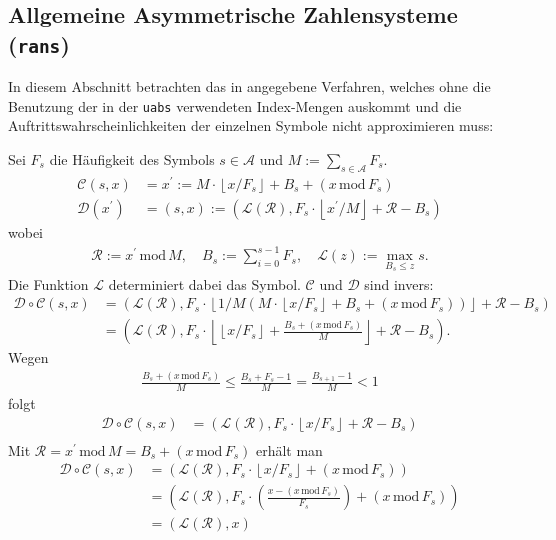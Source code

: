 \documentclass[a4paper,12pt]{article}
\newcommand{\R}{\mathcal R}
\newcommand{\A}{\mathcal A}
\newcommand{\C}{\mathcal C}
\newcommand{\D}{\mathcal D}
\newcommand{\xL}{\mathcal L}
\begin{document}
\subsection{Allgemeine Asymmetrische Zahlensysteme ({\tt{rans}})}
In diesem Abschnitt betrachten das in \cite{Krajcevski} angegebene Verfahren, welches ohne die Benutzung der in der {\tt{uabs}} verwendeten Index-Mengen auskommt und die Auftrittswahrscheinlichkeiten der einzelnen Symbole nicht approximieren muss:
\par
Sei $F_{s}$ die Häufigkeit des Symbols $s\in\A$ und $M:=\sum_{s\in\A}F_{s}$.
\begin{align*}
\C(s,x)&= x^{'} := M \cdot \left\lfloor x / F_{s}  \right\rfloor + B_{s} + \left(x\,\text{mod}\,F_{s}\right)
\\
\D(x^{'}) &=(s, x):=\left(\xL(\R),   F_{s}\cdot\left\lfloor x^{'} / M \right\rfloor    + \R - B_{s}\right)
\end{align*} 
wobei
\begin{align*}
\R := x^{'}\,\text{mod}\,M, \quad B_{s}:=\sum_{i=0}^{s-1} F_{s},
\quad
\xL(z):= \max_{B_{s} \leq z} s .
\end{align*}
Die Funktion $\xL$ determiniert dabei das Symbol.
$\C$ und $\D$ sind invers:
\begin{align*}
\D \circ \C(s, x)&=\left(\xL(\R),F_{s}\cdot \left\lfloor   1 / M \left( 
M\cdot \left\lfloor  x / F_{s}\right\rfloor  + B_{s}   +  \left(x\,\text{mod}\,F_{s}\right)
\right)  \right\rfloor    + \R - B_{s}\right)
\\
&=
\left(\xL(\R),F_{s}\cdot \left\lfloor 
\left\lfloor  x / F_{s}\right\rfloor  + \frac{B_{s}   +  \left(x\,\text{mod}\,F_{s}\right)}{M}
\right\rfloor  + \R - B_{s} \right).
\end{align*}
Wegen 
\begin{align*}
\frac{B_{s}   +  \left(x\,\text{mod}\,F_{s}\right)}{M} \leq \frac{B_{s}   +  F_{s}-1}{M} = \frac{B_{s+1}-1}{M} < 1
\end{align*}
folgt
\begin{align*}
\D \circ \C(s, x)&=
\left(\xL(\R),F_{s}\cdot
\left\lfloor  x / F_{s}\right\rfloor  + \R - B_{s} \right)
\\
\end{align*}
Mit $\R = x^{'}\,\text{mod}\,M = B_{s} + \left(x\,\text{mod}\,F_{s}\right)$
erhält man
\begin{align*}
\D \circ \C(s, x)&=
\left(\xL(\R),F_{s}\cdot
\left\lfloor  x / F_{s}\right\rfloor  + \left(x\,\text{mod}\,F_{s}\right) \right)
\\
&=
\left(\xL(\R),F_{s}\cdot
\left(\frac{x - \left(x\,\text{mod}\,F_{s}\right)}{F_{s}}\right) + \left(x\,\text{mod}\,F_{s}\right) \right)
\\
&=\left(\xL(\R),x\right)
\end{align*}
\end{document}
